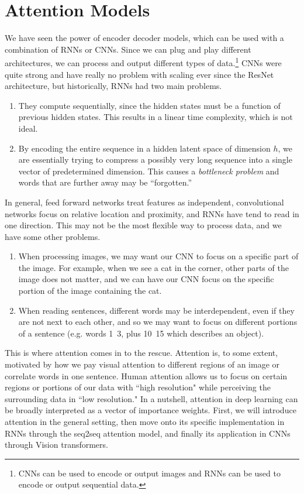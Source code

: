 \section{Attention Models}

  We have seen the power of encoder decoder models, which can be used with a combination of RNNs or CNNs. Since we can plug and play different architectures, we can process and output different types of data.\footnote{CNNs can be used to encode or output images and RNNs can be used to encode or output sequential data.} CNNs were quite strong and have really no problem with scaling ever since the ResNet architecture, but historically, RNNs had two main problems. 
  \begin{enumerate} 
    \item They compute sequentially, since the hidden states must be a function of previous hidden states. This results in a linear time complexity, which is not ideal. 
    \item By encoding the entire sequence in a hidden latent space of dimension $h$, we are essentially trying to compress a possibly very long sequence into a single vector of predetermined dimension. This causes a \textit{bottleneck problem} and words that are further away may be ``forgotten.''
  \end{enumerate}


  In general, feed forward networks treat features as independent, convolutional networks focus on relative location and proximity, and RNNs have tend to read in one direction. This may not be the most flexible way to process data, and we have some other problems. 
  \begin{enumerate}
      \item When processing images, we may want our CNN to focus on a specific part of the image. For example, when we see a cat in the corner, other parts of the image does not matter, and we can have our CNN focus on the specific portion of the image containing the cat. 
      \item When reading sentences, different words may be interdependent, even if they are not next to each other, and so we may want to focus on different portions of a sentence (e.g. words 1~3, plus 10~15 which describes an object). 
  \end{enumerate}

  This is where attention comes in to the rescue. Attention is, to some extent, motivated by how we pay visual attention to different regions of an image or correlate words in one sentence. Human attention allows us to focus on certain regions or portions of our data with ``high resolution" while perceiving the surrounding data in ``low resolution." In a nutshell, attention in deep learning can be broadly interpreted as a vector of importance weights. First, we will introduce attention in the general setting, then move onto its specific implementation in RNNs through the seq2seq attention model, and finally its application in CNNs through Vision transformers. 


